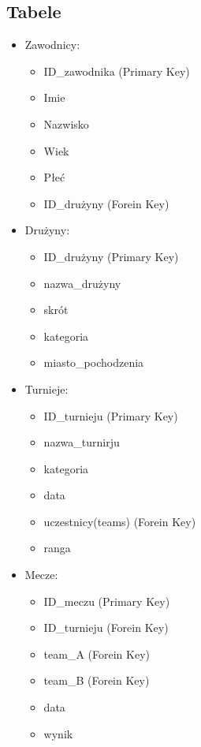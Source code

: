 \documentclass[polish, 11pt]{article}
\begin{document}
	\subsection{Tabele}
	    
	    \begin{itemize}
	    
	    	\item 	 Zawodnicy:
	    		\begin{itemize}
	    			\item ID\_zawodnika (Primary Key)
			    	\item Imie
			    	\item Nazwisko
			    	\item Wiek
			    	\item Płeć
			    	\item ID\_drużyny (Forein Key)
	    		\end{itemize}
	    		
	    	\item 	   Drużyny:
	    		\begin{itemize}
			    	\item ID\_drużyny (Primary Key)
					\item nazwa\_drużyny
					\item skrót
					\item kategoria
					\item miasto\_pochodzenia
				 \end{itemize}
				 
	    	\item	Turnieje:
	    		\begin{itemize}
			    	\item ID\_turnieju (Primary Key)
			    	\item nazwa\_turnirju
			    	\item kategoria
			    	\item data
			    	\item uczestnicy(teams) (Forein Key)
			    	\item ranga
			    \end{itemize}

	    	\item	Mecze:
	    		\begin{itemize}
			    	\item ID\_meczu (Primary Key)
			    	\item ID\_turnieju (Forein Key)
			    	\item team\_A (Forein Key)
			    	\item team\_B (Forein Key)
			    	\item data
			    	\item wynik
			    \end{itemize}
			    

\end{itemize}
\end{document}
